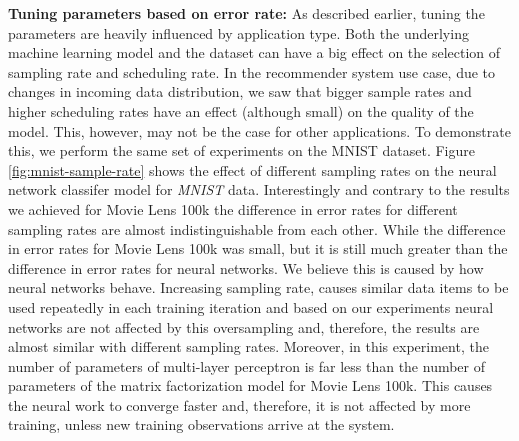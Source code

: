 \documentclass{vldb}
\begin{document}
\textbf{Tuning parameters based on error rate:} As described earlier, tuning the parameters are heavily influenced by application type.
Both the underlying machine learning model and the dataset can have a big effect on the selection of sampling rate and scheduling rate.
In the recommender system use case, due to changes in incoming data distribution, we saw that bigger sample rates and higher scheduling rates have an effect (although small) on the quality of the model.
This, however, may not be the case for other applications.
To demonstrate this, we perform the same set of experiments on the MNIST dataset.
Figure \ref{fig:mnist-sample-rate} shows the effect of different sampling rates on the neural network classifer model for \textit{MNIST} data.
Interestingly and contrary to the results we achieved for Movie Lens 100k the difference in error rates for different sampling rates are almost indistinguishable from each other.
While the difference in error rates for Movie Lens 100k was small, but it is still much greater than the difference in error rates for neural networks.
We believe this is caused by how neural networks behave.
Increasing sampling rate, causes similar data items to be used repeatedly in each training iteration and based on our experiments neural networks are not affected by this oversampling and, therefore, the results are almost similar with different sampling rates.
Moreover, in this experiment, the number of parameters of multi-layer perceptron is far less than the number of parameters of the matrix factorization model for Movie Lens 100k.
This causes the neural work to converge faster and, therefore, it is not affected by more training, unless new training observations arrive at the system.
\end{document}
